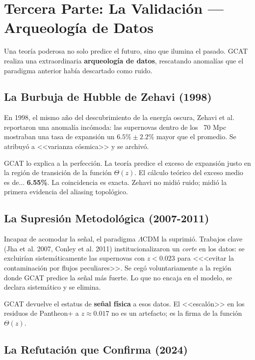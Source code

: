 \documentclass[12pt, a4paper]{article}
\begin{document}
\section{Tercera Parte: La Validación — Arqueología de Datos}

Una teoría poderosa no solo predice el futuro, sino que ilumina el pasado. GCAT realiza una extraordinaria \textbf{arqueología de datos}, rescatando anomalías que el paradigma anterior había descartado como ruido.

\subsection{La Burbuja de Hubble de Zehavi (1998)}

En 1998, el mismo año del descubrimiento de la energía oscura, Zehavi et al. reportaron una anomalía incómoda: las supernovas dentro de los ~70 Mpc mostraban una tasa de expansión un $6.5\% \pm 2.2\%$ mayor que el promedio. Se atribuyó a <<varianza cósmica>> y se archivó.

GCAT lo explica a la perfección. La teoría predice el exceso de expansión justo en la región de transición de la función $\Theta(z)$. El cálculo teórico del exceso medio es de... \textbf{6.55\%}. La coincidencia es exacta. Zehavi no midió ruido; midió la primera evidencia del aliasing topológico.

\subsection{La Supresión Metodológica (2007-2011)}

Incapaz de acomodar la señal, el paradigma $\Lambda$CDM la suprimió. Trabajos clave (Jha et al. 2007, Conley et al. 2011) institucionalizaron un \textit{corte} en los datos: se excluirían sistemáticamente las supernovas con $z < 0.023$ para <<<evitar la contaminación por flujos peculiares>>. Se cegó voluntariamente a la región donde GCAT predice la señal más fuerte. Lo que no encaja en el modelo, se declara sistemático y se elimina.

GCAT devuelve el estatus de \textbf{señal física} a esos datos. El <<escalón>> en los residuos de Pantheon+ a $z \approx 0.017$ no es un artefacto; es la firma de la función $\Theta(z)$.

\subsection{La Refutación que Confirma (2024)}
\end{document}
